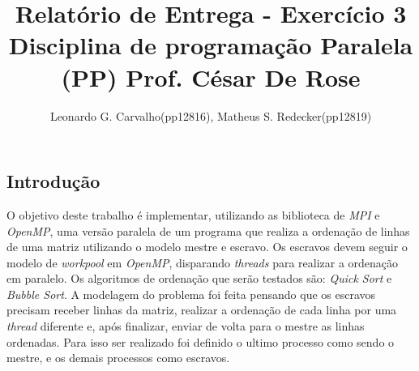 \documentclass[12pt]{article}
\title{Relatório de Entrega - Exercício 3  \\
       Disciplina de programação Paralela (PP) Prof. César De Rose
       }
\author{Leonardo G. Carvalho(pp12816), Matheus S. Redecker(pp12819)}
\begin{document}
 


\maketitle

{\footnotesize
\begin{multicols}{2}
\section{Introdução}
O objetivo deste trabalho é implementar, utilizando as biblioteca de \textit{MPI} e \textit{OpenMP}, uma versão paralela de um programa que realiza a ordenação de linhas de uma matriz utilizando o modelo mestre e escravo. Os escravos devem seguir o modelo de \textit{workpool} em \textit{OpenMP}, disparando \textit{threads} para realizar a ordenação em paralelo. Os algoritmos de ordenação que serão testados são: \textit{Quick Sort} e \textit{Bubble Sort}.  A modelagem do problema foi feita pensando que os escravos precisam receber linhas da matriz, realizar a ordenação de cada linha por uma \textit{thread} diferente e, após finalizar, enviar de volta para o mestre as linhas ordenadas. Para isso ser realizado foi definido o ultimo processo como sendo o mestre, e os demais processos como escravos. 


\end{multicols}}
\end{document}
